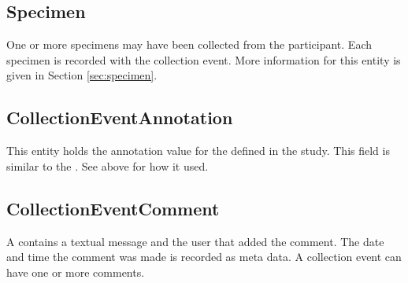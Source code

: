 \subsection*{Specimen}
One or more specimens may have been collected from the participant. Each
specimen is recorded with the collection event. More information for this
entity is given in Section \ref{sec:specimen}.

\subsection*{CollectionEventAnnotation}
This entity holds the annotation value for the
 defined in the study. This field
is similar to the . See above for how it used.

\subsection*{CollectionEventComment}
A  contains a textual message and the user
that added the comment. The date and time the comment was made is recorded as
meta data. A collection event can have one or more comments.



